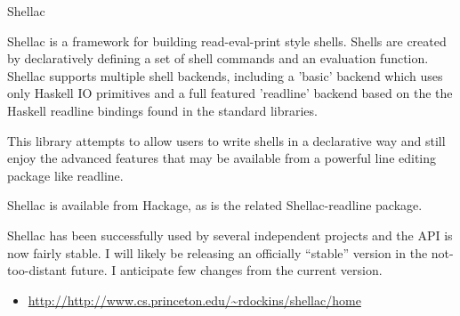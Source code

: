 \documentclass{article}
\begin{document}
\begin{hcarentry}{Shellac}
\makeheader

Shellac is a framework for building read-eval-print style shells.  
Shells are created by declaratively defining a set of shell commands
and an evaluation function.  Shellac supports multiple shell backends,
including a 'basic' backend which uses only Haskell IO primitives and
a full featured 'readline' backend based on the the Haskell readline
bindings found in the standard libraries.

This library attempts to allow users to write shells in a declarative
way and still enjoy the advanced features that may be available from a
powerful line editing package like readline. 

Shellac is available from Hackage, as is the related
Shellac-readline package.

Shellac has been successfully used by several independent projects
and the API is now fairly stable.  I will likely be releasing an
officially ``stable'' version in the not-too-distant future.
I anticipate few changes from the current version.

\FurtherReading
\begin{itemize}
\item \url{http://http://www.cs.princeton.edu/~rdockins/shellac/home}
\end{itemize}
\end{hcarentry}
\end{document}
